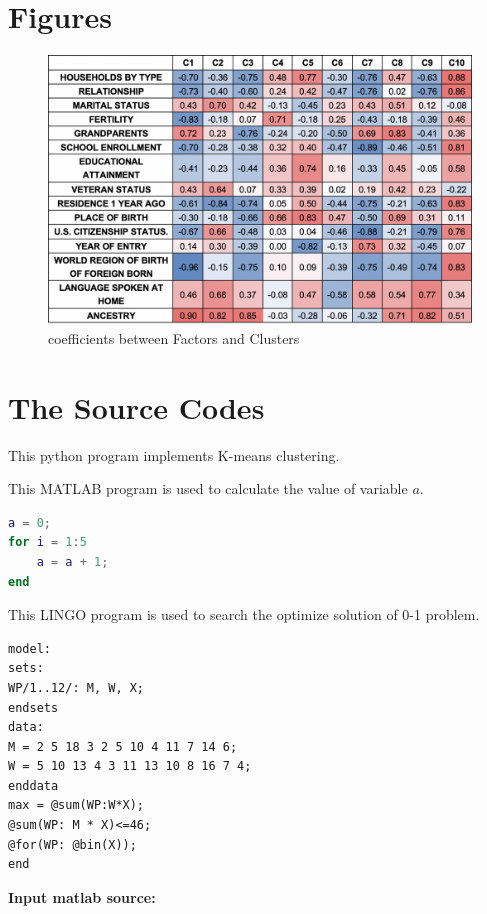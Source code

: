 \documentclass[12pt]{article}
\begin{document}
\clearpage
\begin{appendices}
\section{Figures}
\begin{figure}[H]
	\centering
	\includegraphics[scale=0.5]{./figures/a1.png}
	\caption{coefficients between Factors and Clusters}
\end{figure}

\section{The Source Codes}		%


This python program implements K-means clustering.


This MATLAB program is used to calculate the value of variable $a$.
\begin{lstlisting}[language={Matlab}, caption=\texttt{temp.m}]
a = 0;
for i = 1:5
	a = a + 1;
end
\end{lstlisting}

This LINGO program is used to search the optimize solution of 0-1 problem.
\begin{lstlisting}[language=Lingo, caption=\texttt{temp.lg4}]
model:
sets:
WP/1..12/: M, W, X;
endsets
data:
M = 2 5 18 3 2 5 10 4 11 7 14 6;
W = 5 10 13 4 3 11 13 10 8 16 7 4;
enddata
max = @sum(WP:W*X);
@sum(WP: M * X)<=46;
@for(WP: @bin(X));
end
\end{lstlisting}

\textbf{\textcolor[rgb]{0.98,0.00,0.00}{Input matlab source:}}
% 

\end{appendices}
\end{document}
